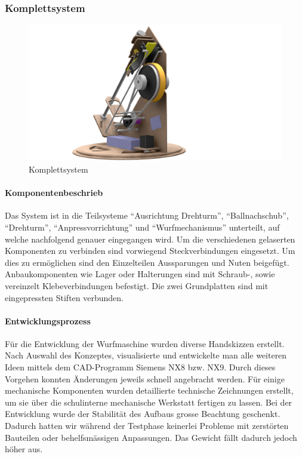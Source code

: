 \subsubsection{Komplettsystem}
\begin{figure}[h!]
	\centering
	\includegraphics[width=\linewidth]{../../fig/Komplettsystem}
	\caption{Komplettsystem}
	\label{fig:Komplettsystem}
\end{figure}
\paragraph{Komponentenbeschrieb\\}
Das System ist in die Teilsysteme "`Ausrichtung Drehturm"', "`Ballnachschub"', "`Drehturm"', "`Anpressvorrichtung"' und "`Wurfmechanismus"' unterteilt, auf welche nachfolgend genauer eingegangen wird. Um die verschiedenen gelaserten Komponenten zu verbinden sind vorwiegend Steckverbindungen eingesetzt. Um dies zu ermöglichen sind den Einzelteilen Aussparungen und Nuten beigefügt. Anbaukomponenten wie Lager oder Halterungen sind mit Schraub-, sowie vereinzelt Klebeverbindungen befestigt. Die zwei Grundplatten sind mit eingepressten Stiften verbunden.

\paragraph{Entwicklungsprozess\\}
Für die Entwicklung der Wurfmaschine wurden diverse Handskizzen erstellt. Nach Auswahl des Konzeptes, visualisierte und entwickelte man alle weiteren Ideen mittels dem CAD-Programm Siemens NX8 bzw. NX9. Durch dieses Vorgehen konnten Änderungen jeweils schnell angebracht werden. Für einige mechanische Komponenten wurden detaillierte technische Zeichnungen erstellt, um sie über die schulinterne mechanische Werkstatt fertigen zu lassen. Bei der Entwicklung wurde der Stabilität des Aufbaus grosse Beachtung geschenkt. Dadurch hatten wir während der Testphase keinerlei Probleme mit zerstörten Bauteilen oder behelfsmässigen Anpassungen. Das Gewicht fällt dadurch jedoch höher aus. 